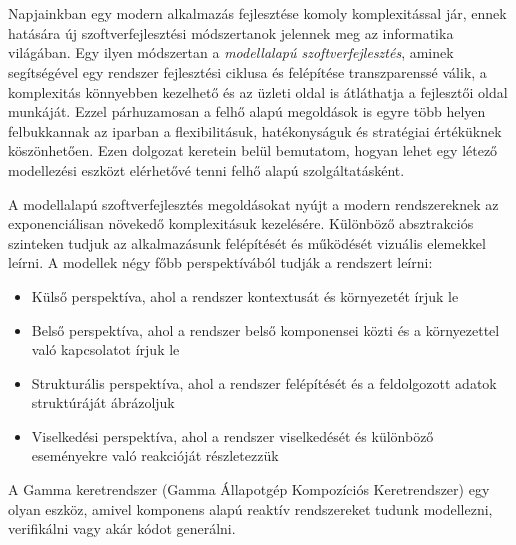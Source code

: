 \chapter{\bevezetes}

Napjainkban egy modern alkalmazás fejlesztése komoly komplexitással jár, ennek hatására új szoftverfejlesztési módszertanok jelennek meg az informatika világában. Egy ilyen módszertan a \textit{modellalapú szoftverfejlesztés}, aminek segítségével egy rendszer fejlesztési ciklusa és felépítése transzparenssé válik, a komplexitás könnyebben kezelhető és az üzleti oldal is átláthatja a fejlesztői oldal munkáját. Ezzel párhuzamosan a felhő alapú megoldások is egyre több helyen felbukkannak az iparban a flexibilitásuk, hatékonyságuk és stratégiai értéküknek köszönhetően. Ezen dolgozat keretein belül bemutatom, hogyan lehet egy létező modellezési eszközt elérhetővé tenni felhő alapú szolgáltatásként.

A modellalapú szoftverfejlesztés megoldásokat nyújt a modern rendszereknek az exponenciálisan növekedő komplexitásuk kezelésére. Különböző absztrakciós szinteken tudjuk az alkalmazásunk felépítését és működését vizuális elemekkel leírni. A modellek négy főbb perspektívából tudják a rendszert leírni\cite{cs1}:

 \begin{itemize}
 	\item Külső perspektíva, ahol a rendszer kontextusát és környezetét írjuk le
 	\item Belső perspektíva, ahol a rendszer belső komponensei közti és a környezettel való kapcsolatot írjuk le
 	\item Strukturális perspektíva, ahol a rendszer felépítését és a feldolgozott adatok struktúráját ábrázoljuk
 	\item Viselkedési perspektíva, ahol a rendszer viselkedését és különböző eseményekre való reakcióját részletezzük
 \end{itemize}
A Gamma keretrendszer \cite{DBLP:journals/sosym/GraicsMVMV20} (Gamma Állapotgép Kompozíciós Keretrendszer) egy olyan eszköz, amivel komponens alapú reaktív rendszereket tudunk modellezni, verifikálni vagy akár kódot generálni.

